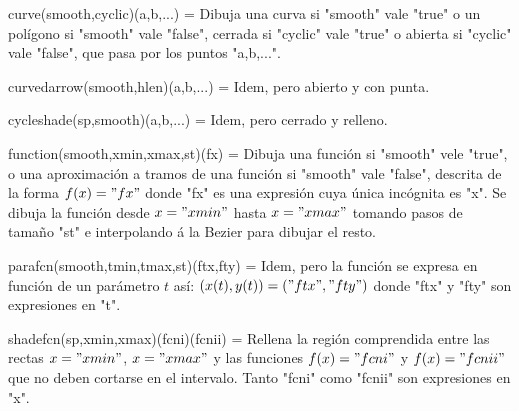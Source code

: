 \macro curve(smooth,cyclic)(a,b,...) = Dibuja una curva si "smooth"
vale "true" o un polígono si "smooth" vale "false", cerrada si
"cyclic" vale "true" o abierta si "cyclic" vale "false", que pasa
por los puntos "a,b,...".

\macro curvedarrow(smooth,hlen)(a,b,...) = Idem, pero abierto y con
punta.

\macro cycleshade(sp,smooth)(a,b,...) = Idem, pero cerrado y
relleno.

\macro function(smooth,xmin,xmax,st)(fx) = Dibuja una función si
"smooth" vele "true", o una aproximación a tramos de una función si
"smooth" vale "false", descrita de la forma $f(x) = "fx"$ donde "fx"
es una expresión {\MF} cuya única incógnita es "x".  Se dibuja la
función desde $x = "xmin"$ hasta $x = "xmax"$ tomando pasos de
tamaño "st" e interpolando á la Bezier para dibujar el resto.

\macro parafcn(smooth,tmin,tmax,st)(ftx,fty) = Idem, pero la función
se expresa en función de un parámetro $t$ así:  $(x(t),y(t)) =
("ftx","fty")$ donde "ftx" y "fty" son expresiones {\MF} en "t".

\macro shadefcn(sp,xmin,xmax)(fcni)(fcnii) = Rellena la región
comprendida entre las rectas $x = "xmin"$, $x = "xmax"$ y las
funciones $f(x) = "fcni"$ y $f(x) = "fcnii"$ que no deben cortarse
en el intervalo.  Tanto "fcni" como "fcnii" son expresiones {\MF} en
"x".

\bye
